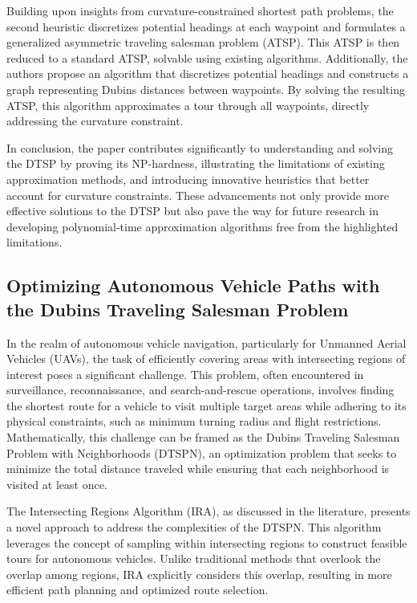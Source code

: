 \vspace*{6mm}

Building upon insights from curvature-constrained shortest path problems, the second heuristic discretizes potential headings at each waypoint and formulates a generalized asymmetric traveling salesman problem (ATSP). This ATSP is then reduced to a standard ATSP, solvable using existing algorithms. Additionally, the authors propose an algorithm that discretizes potential headings and constructs a graph representing Dubins distances between waypoints. By solving the resulting ATSP, this algorithm approximates a tour through all waypoints, directly addressing the curvature constraint.

\vspace*{6mm}

In conclusion, the paper contributes significantly to understanding and solving the DTSP by proving its NP-hardness, illustrating the limitations of existing approximation methods, and introducing innovative heuristics that better account for curvature constraints. These advancements not only provide more effective solutions to the DTSP but also pave the way for future research in developing polynomial-time approximation algorithms free from the highlighted limitations.


\subsection{Optimizing Autonomous Vehicle Paths with the Dubins Traveling Salesman Problem}


In the realm of autonomous vehicle navigation, particularly for Unmanned Aerial Vehicles (UAVs), the task of efficiently covering areas with intersecting regions of interest poses a significant challenge. This problem, often encountered in surveillance, reconnaissance, and search-and-rescue operations, involves finding the shortest route for a vehicle to visit multiple target areas while adhering to its physical constraints, such as minimum turning radius and flight restrictions. Mathematically, this challenge can be framed as the Dubins Traveling Salesman Problem with Neighborhoods (DTSPN), an optimization problem that seeks to minimize the total distance traveled while ensuring that each neighborhood is visited at least once.

\vspace*{6mm}

The Intersecting Regions Algorithm (IRA), as discussed in the literature, presents a novel approach to address the complexities of the DTSPN. This algorithm leverages the concept of sampling within intersecting regions to construct feasible tours for autonomous vehicles. Unlike traditional methods that overlook the overlap among regions, IRA explicitly considers this overlap, resulting in more efficient path planning and optimized route selection.

